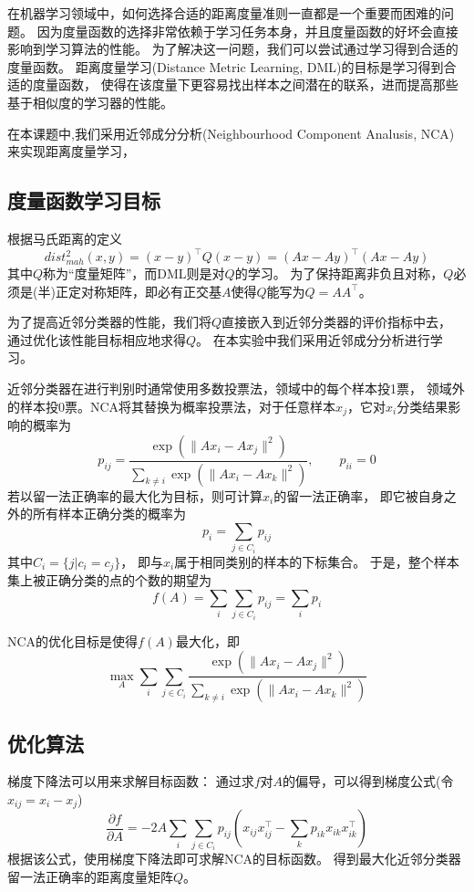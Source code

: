 \documentclass[a4paper,UTF8]{article}
\theoremstyle{definition}
\begin{document}
在机器学习领域中，如何选择合适的距离度量准则一直都是一个重要而困难的问题。
因为度量函数的选择非常依赖于学习任务本身，并且度量函数的好坏会直接影响到学习算法的性能。
为了解决这一问题，我们可以尝试通过学习得到合适的度量函数。
距离度量学习(Distance Metric Learning, DML)的目标是学习得到合适的度量函数，
使得在该度量下更容易找出样本之间潜在的联系，进而提高那些基于相似度的学习器的性能。

在本课题中,我们采用近邻成分分析(Neighbourhood Component Analusis, NCA)来实现距离度量学习，

\subsection*{度量函数学习目标}

根据马氏距离的定义
\[
	dist_{mah}^2(x, y) = (x - y)^\top Q(x - y) = (Ax - Ay)^\top (Ax - Ay)
\]
其中$Q$称为“度量矩阵”，而DML则是对$Q$的学习。
为了保持距离非负且对称，$Q$必须是(半)正定对称矩阵，即必有正交基$A$使得$Q$能写为$Q = AA^\top$。

为了提高近邻分类器的性能，我们将$Q$直接嵌入到近邻分类器的评价指标中去，
通过优化该性能目标相应地求得$Q$。
在本实验中我们采用近邻成分分析进行学习。

近邻分类器在进行判别时通常使用多数投票法，领域中的每个样本投1票，
领域外的样本投0票。NCA将其替换为概率投票法，对于任意样本$x_{j}$，它对$x_{i}$分类结果影响的概率为
\[
	p_{ij} = \frac{\exp(\lVert Ax_{i} - Ax_{j} \rVert^2)}
	{\sum_{k \neq i} \exp(\lVert Ax_{i} - Ax_{k} \rVert^2)}, \qquad
	p_{ii} = 0
\]
若以留一法正确率的最大化为目标，则可计算$x_{i}$的留一法正确率，
即它被自身之外的所有样本正确分类的概率为
\[
	p_{i} = \sum_{j \in C_{i}} p_{ij}
\]
其中$C_{i} = \lbrace j \vert c_{i} = c_{j} \rbrace$，
即与$x_{i}$属于相同类别的样本的下标集合。
于是，整个样本集上被正确分类的点的个数的期望为
\[
	f(A) = \sum_{i} \sum_{j \in C_{i}} p_{ij} = \sum_{i} p_{i}
\]

NCA的优化目标是使得$f(A)$最大化，即
\[
	\max_{A} \sum_{i} \sum_{j \in C_{i}}
	\frac{\exp(\lVert Ax_{i} - Ax_{j} \rVert^2)}
	{\sum_{k \neq i} \exp(\lVert Ax_{i} - Ax_{k} \rVert^2)}
\]

\subsection*{优化算法}

梯度下降法可以用来求解目标函数：
通过求$f$对$A$的偏导，可以得到梯度公式(令$x_{ij} = x_{i} - x_{j}$)
\[
	\frac{\partial f}{\partial A} =
	-2A \sum_{i} \sum_{j \in C_{i}}
	p_{ij}( x_{ij} x_{ij}^\top - \sum_{k} p_{ik} x_{ik} x_{ik}^\top)
\]
根据该公式，使用梯度下降法即可求解NCA的目标函数。
得到最大化近邻分类器留一法正确率的距离度量矩阵$Q$。
\end{document}
